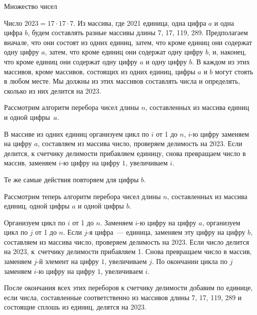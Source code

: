 \begin{tutorial}{Множество чисел}

Число $2023=17 \cdot 17 \cdot 7$. Из массива, где 2021 единица, одна цифра $a$ и одна цифра $b$, будем составлять разные массивы длины 7, 17, 119, 289. Предполагаем вначале, что они состоят из  одних единиц, затем, что кроме единиц они содержат одну цифру $a$, затем, что кроме единиц они содержат одну цифру $b$, и, наконец, что кроме единиц они содержат одну цифру $a$ и одну цифру $b$. В каждом из этих массивов,  кроме массивов, состоящих из одних единиц, цифры $a$ и $b$ могут стоять в любом месте. Мы должны из этих массивов составлять числа и определять, сколько из них делится на 2023. 

Рассмотрим алгоритм перебора чисел длины $n$, составленных из массива  единиц и одной цифры~$a$.

В массиве из одних единиц организуем цикл по $i$ от 1 до $n$, $i$-ю цифру заменяем на цифру $a$, составляем из массива число, проверяем делимость на 2023. Если делится, к счетчику делимости прибавляем единицу, снова превращаем число в массив, заменяем  $i$-ю цифру на цифру $1$, увеличиваем $i$. 

Те же самые действия повторяем для цифры $b$.

Рассмотрим теперь алгоритм перебора чисел длины $n$, составленных из массива единиц, одной цифры $a$ и одной цифры $b$. 

Организуем цикл по $i$ от 1 до $n$. Заменяем $i$-ю цифру на цифру $a$, организуем цикл по $j$ от 1 до $n$. Если $j$-я цифра~--- единица, заменяем эту цифру на цифру $b$, составляем из массива число, проверяем делимость на 2023. Если число делится на 2023, к~счетчику делимости прибавляем 1. Снова превращаем число в массив, заменяем $j$-й элемент на цифру $1$, увеличиваем $j$. По окончании цикла по $j$ заменяем $i$-ю цифру на цифру $1$, увеличиваем $i$. 

После окончания всех этих переборов к счетчику делимости добавим по единице, если числа, составленные соответственно из массивов длины 7,  17, 119, 289 и состоящие сплошь из единиц, делятся на 2023.    

\end{tutorial}
